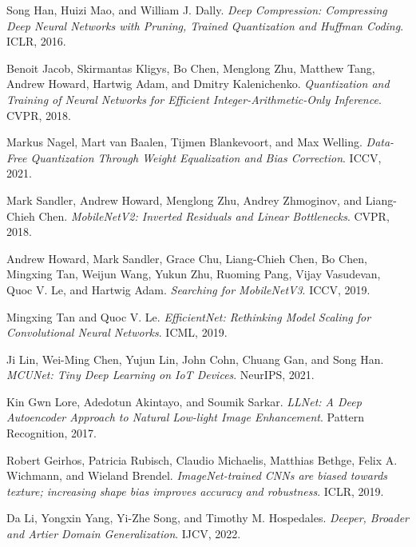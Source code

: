 \documentclass[11pt, oneside]{article}   	%
\begin{document}
\begin{thebibliography}{9}

	Song Han, Huizi Mao, and William J. Dally.
	\textit{Deep Compression: Compressing Deep Neural Networks with Pruning, Trained Quantization and Huffman Coding}.
	ICLR, 2016.

	Benoit Jacob, Skirmantas Kligys, Bo Chen, Menglong Zhu, Matthew Tang, Andrew Howard, Hartwig Adam, and Dmitry Kalenichenko.
	\textit{Quantization and Training of Neural Networks for Efficient Integer-Arithmetic-Only Inference}.
	CVPR, 2018.

	Markus Nagel, Mart van Baalen, Tijmen Blankevoort, and Max Welling.
	\textit{Data-Free Quantization Through Weight Equalization and Bias Correction}.
	ICCV, 2021.

	Mark Sandler, Andrew Howard, Menglong Zhu, Andrey Zhmoginov, and Liang-Chieh Chen.
	\textit{MobileNetV2: Inverted Residuals and Linear Bottlenecks}.
	CVPR, 2018.

	Andrew Howard, Mark Sandler, Grace Chu, Liang-Chieh Chen, Bo Chen, Mingxing Tan, Weijun Wang, Yukun Zhu, Ruoming Pang, Vijay Vasudevan, Quoc V. Le, and Hartwig Adam.
	\textit{Searching for MobileNetV3}.
	ICCV, 2019.

	Mingxing Tan and Quoc V. Le.
	\textit{EfficientNet: Rethinking Model Scaling for Convolutional Neural Networks}.
	ICML, 2019.

	Ji Lin, Wei-Ming Chen, Yujun Lin, John Cohn, Chuang Gan, and Song Han.
	\textit{MCUNet: Tiny Deep Learning on IoT Devices}.
	NeurIPS, 2021.

	Kin Gwn Lore, Adedotun Akintayo, and Soumik Sarkar.
	\textit{LLNet: A Deep Autoencoder Approach to Natural Low-light Image Enhancement}.
	Pattern Recognition, 2017.

	Robert Geirhos, Patricia Rubisch, Claudio Michaelis, Matthias Bethge, Felix A. Wichmann, and Wieland Brendel.
	\textit{ImageNet-trained CNNs are biased towards texture; increasing shape bias improves accuracy and robustness}.
	ICLR, 2019.

	Da Li, Yongxin Yang, Yi-Zhe Song, and Timothy M. Hospedales.
	\textit{Deeper, Broader and Artier Domain Generalization}.
	IJCV, 2022.

\end{thebibliography}
\end{document}
